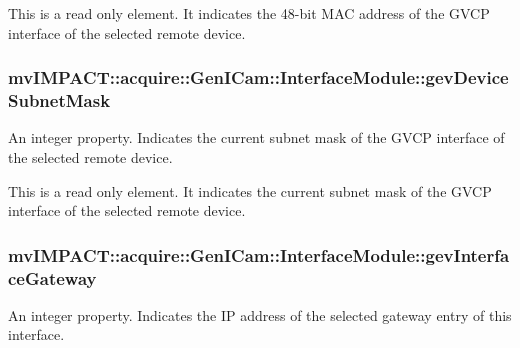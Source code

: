 This is a read only element. It indicates the 48-\/bit M\+A\+C address of the G\+V\+C\+P interface of the selected remote device. \hypertarget{classmv_i_m_p_a_c_t_1_1acquire_1_1_gen_i_cam_1_1_interface_module_a2365b591ab9a6225fd368641112f95f9}{
\subsubsection[{gev\+Device\+Subnet\+Mask}]{ mv\+I\+M\+P\+A\+C\+T\+::acquire\+::\+Gen\+I\+Cam\+::\+Interface\+Module\+::gev\+Device\+Subnet\+Mask}}\label{classmv_i_m_p_a_c_t_1_1acquire_1_1_gen_i_cam_1_1_interface_module_a2365b591ab9a6225fd368641112f95f9}


An integer property. Indicates the current subnet mask of the G\+V\+C\+P interface of the selected remote device. 

This is a read only element. It indicates the current subnet mask of the G\+V\+C\+P interface of the selected remote device. \hypertarget{classmv_i_m_p_a_c_t_1_1acquire_1_1_gen_i_cam_1_1_interface_module_aa2197643d10449676d08f8b97f3b4765}{
\subsubsection[{gev\+Interface\+Gateway}]{ mv\+I\+M\+P\+A\+C\+T\+::acquire\+::\+Gen\+I\+Cam\+::\+Interface\+Module\+::gev\+Interface\+Gateway}}\label{classmv_i_m_p_a_c_t_1_1acquire_1_1_gen_i_cam_1_1_interface_module_aa2197643d10449676d08f8b97f3b4765}


An integer property. Indicates the I\+P address of the selected gateway entry of this interface. 

